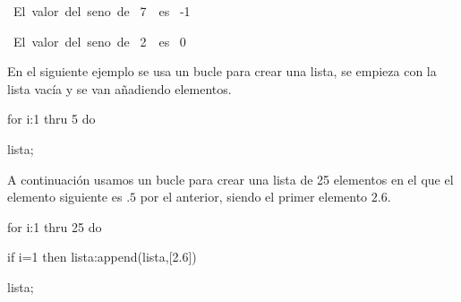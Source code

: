 \begin{maximaop}
\mbox{ El valor del seno de  }
{{7\,\pi}}
\mbox{  es  }
-{{1}}
\end{maximaop}
\begin{maximaop}
\mbox{ El valor del seno de  }
2\,\pi
\mbox{  es  }
0
\end{maximaop}

En el siguiente ejemplo se usa un bucle para crear una lista,
se empieza con la lista vacía y se van añadiendo elementos.

\begin{maximal}
for i:1 thru 5 do
\end{maximal}\begin{maximal}
lista;
\end{maximal}
\begin{maximao}
\left[ 1 , 4 , 9 , 16 , 25 \right] 
\end{maximao}

A continuación usamos un bucle para crear una lista de 25 elementos
en el que el elemento siguiente es $.5$ por el anterior, siendo el
primer elemento $2.6$.

\begin{maximal}
for i:1 thru 25 do
\end{maximal}\begin{maximal}
if i=1 then lista:append(lista,[2.6])
\end{maximal}\begin{maximal}
lista;
\end{maximal}
\begin{maximao}
\end{maximao}

